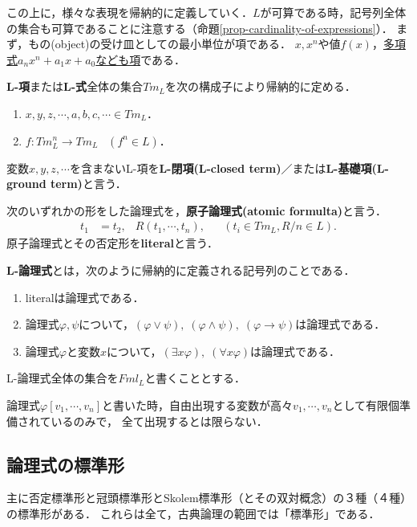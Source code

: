 \documentclass[uplatex, 12pt, dvipdfmx]{jsreport}
\begin{document}
この上に，様々な表現を帰納的に定義していく．$L$が可算である時，記号列全体の集合も可算であることに注意する（命題\ref{prop-cardinality-of-expressions}）．
まず，もの(object)の受け皿としての最小単位が項である．
$x,x^n$や値$f(x)$，\underline{多項式$a_nx^n+a_1x+a_0$なども項}である．

\begin{definition}[term]
    \textbf{L-項}または\textbf{L-式}全体の集合$Tm_L$を次の構成子により帰納的に定める．
    \begin{enumerate}
        \item  $x,y,z,\cdots,a,b,c,\cdots\in Tm_L$．
        \item  $f:Tm_L^n\to Tm_L\;\;\;(f^n\in L)$．
    \end{enumerate}
    変数$x,y,z,\cdots$を含まないL-項を\textbf{L-閉項(L-closed term)}／または\textbf{L-基礎項(L-ground term)}と言う．
\end{definition}

\begin{definition}[literal]
    次のいずれかの形をした論理式を，\textbf{原子論理式(atomic formulta)}と言う．
    \begin{align*}
        t_1 &= t_2, & R(t_1,\cdots,t_n), && (t_i\in Tm_L, R/n\in L).
    \end{align*}
    原子論理式とその否定形を\textbf{literal}と言う．
\end{definition}

\begin{definition}[formula]
    \textbf{L-論理式}とは，次のように帰納的に定義される記号列のことである．
    \begin{enumerate}
        \item literalは論理式である．
        \item 論理式$\varphi,\psi$について，$(\varphi\lor\psi),\;(\varphi\land\psi),\;(\varphi\to\psi)$は論理式である．
        \item 論理式$\varphi$と変数$x$について，$(\exists x\varphi),\;(\forall x\varphi)$は論理式である．
    \end{enumerate}
    L-論理式全体の集合を$Fml_L$と書くこととする．
\end{definition}
\begin{remark}
    論理式$\varphi[v_1,\cdots,v_n]$と書いた時，自由出現する変数が高々$v_1,\cdots,v_n$として有限個準備されているのみで，
    全て出現するとは限らない．
\end{remark}

\subsection*{論理式の標準形}
主に否定標準形と冠頭標準形とSkolem標準形（とその双対概念）の３種（４種）の標準形がある．
これらは全て，古典論理の範囲では「標準形」である．
\end{document}

